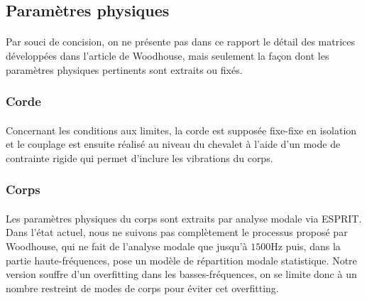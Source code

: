 \subsection{Paramètres physiques}

\paragraph{}
Par souci de concision, on ne présente pas dans ce rapport le détail des
matrices développées dans l'article de Woodhouse, mais seulement la façon dont
les paramètres physiques pertinents sont extraits ou fixés.

\subsubsection{Corde}
  \paragraph{}


  Concernant les conditions aux limites, la corde est supposée fixe-fixe
en isolation et le couplage est ensuite réalisé au niveau du chevalet à l'aide
d'un mode de contrainte rigide qui permet d'inclure les vibrations du corps.

\subsubsection{Corps}

  \paragraph{}
  Les paramètres physiques du corps sont extraits par analyse modale via ESPRIT.
Dans l'état actuel, nous ne suivons pas complètement le processus proposé par
Woodhouse, qui ne fait de l'analyse modale que jusqu'à \( \si{1500\hertz} \)
puis, dans la partie haute-fréquences, pose un modèle de répartition modale
statistique.
Notre version souffre d'un overfitting dans les basses-fréquences, on se limite
donc à un nombre restreint de modes de corps pour éviter cet overfitting.

